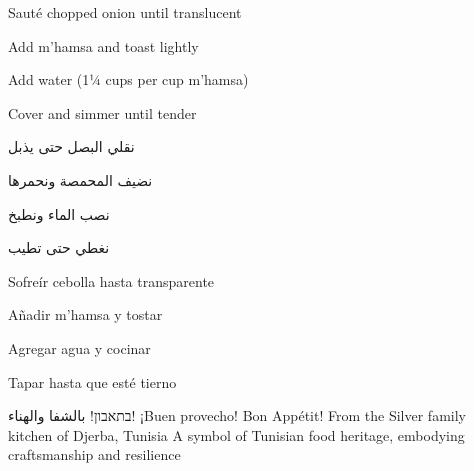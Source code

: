     {%
        \item Sauté chopped onion until translucent
        \item Add m'hamsa and toast lightly
        \item Add water (1¼ cups per cup m'hamsa)
        \item Cover and simmer until tender
    }
    {%
        \item \textarabic{نقلي البصل حتى يذبل}
        \item \textarabic{نضيف المحمصة ونحمرها}
        \item \textarabic{نصب الماء ونطبخ}
        \item \textarabic{نغطي حتى تطيب}
    }
    {%
        \item Sofreír cebolla hasta transparente
        \item Añadir m'hamsa y tostar
        \item Agregar agua y cocinar
        \item Tapar hasta que esté tierno
    }

\recipeclosing
    {\texthebrew{בתאבון!}}
    {\textarabic{بالشفا والهناء!}}
    {¡Buen provecho!}
    {Bon Appétit!}
    {From the Silver family kitchen of Djerba, Tunisia}
    {A symbol of Tunisian food heritage, embodying craftsmanship and resilience} 